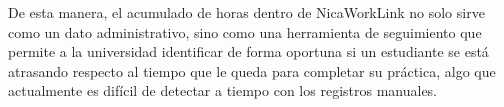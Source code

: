 De esta manera, el acumulado de horas dentro de NicaWorkLink no solo sirve como un dato administrativo, sino como una herramienta de seguimiento que permite a la universidad identificar de forma oportuna si un estudiante se está atrasando respecto al tiempo que le queda para completar su práctica, algo que actualmente es difícil de detectar a tiempo con los registros manuales.
